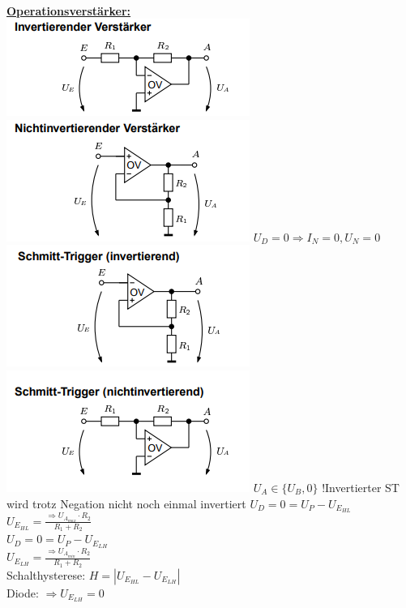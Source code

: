 \documentclass[11pt]{article}
\begin{document}
~~~~~~
\begin{minipage}{0.3\textwidth}
\underline{\textbf{Operationsverstärker:}}\\
\includegraphics[scale=0.40]{IOV.png}
\includegraphics[scale=0.40]{NIOV.png}
$U_D = 0 \Rightarrow I_N = 0, U_N = 0$
\includegraphics[scale=0.40]{ISTOV.png}
\includegraphics[scale=0.40]{NISTOV.png}
$U_A \in \{U_B,0\}$
!Invertierter ST wird trotz Negation nicht noch einmal invertiert
$U_D = 0 = U_P - U_{E_{HL}}$\\
\phantom{sssi}$U_{E_{HL}} = \frac{\Rightarrow U_{A_{max}} \cdot R_2}{R_1 + R_2}$\\
$U_D = 0 = U_P - U_{E_{LH}}$\\
\phantom{sssi}$U_{E_{LH}}= \frac{\Rightarrow U_{A_{min}} \cdot R_2}{R_1 + R_2}$\\
Schalthysterese: $H = |U_{E_{HL}} - U_{E_{LH}}| $\\
Diode: $\Rightarrow U_{E_{LH}} = 0$


\end{minipage}
\end{document}
